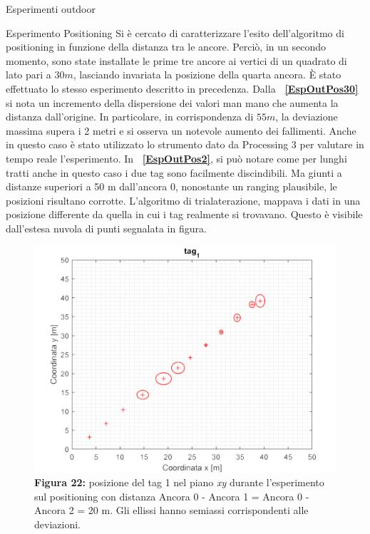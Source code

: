 \documentclass[12pt]{report}
\begin{document}
\begin{section}{Esperimenti outdoor}
\begin{subsection}{Esperimento Positioning}
			Si è cercato di caratterizzare l’esito dell’algoritmo di positioning in funzione della distanza tra le ancore. Perciò, in un secondo momento, sono state installate le prime tre ancore ai vertici di un quadrato di lato pari a $30m$, lasciando invariata la posizione della quarta ancora. È stato effettuato lo stesso 								esperimento descritto in precedenza. Dalla \textbf{\figurename~\ref{EspOutPos30}} si nota un incremento della dispersione dei valori man mano che aumenta la distanza dall’origine. In particolare, in corrispondenza di $55m$, la deviazione massima supera i 2 metri e si osserva un notevole aumento dei 							fallimenti.  Anche in questo caso è stato utilizzato lo strumento dato da Processing 3 per valutare in tempo reale l'esperimento. In \textbf{\figurename~\ref{EspOutPos2}}, si può notare come per lunghi tratti anche in questo caso i due tag sono facilmente discindibili. Ma giunti a distanze superiori a 50 m 							dall'ancora 0, nonostante un ranging plausibile, le posizioni risultano corrotte. L'algoritmo di trialaterazione, mappava i dati in una posizione differente da quella in cui i tag realmente si trovavano. Questo è visibile dall'estesa nuvola di punti segnalata in figura.

			\begin{figure}[H]
				\centering
				\includegraphics[scale=0.3]{EspOutPos20_1}
	 			\caption{\textbf{Figura 22:} posizione del tag 1 nel piano \textit{xy} durante l'esperimento sul positioning con distanza Ancora 0 - Ancora 1 = Ancora 0 - Ancora 2 = 20 m. Gli ellissi hanno semiassi corrispondenti alle deviazioni.\label{EspOutPos20_1}}
			\end{figure}


\end{subsection}
\end{section}
\end{document}
